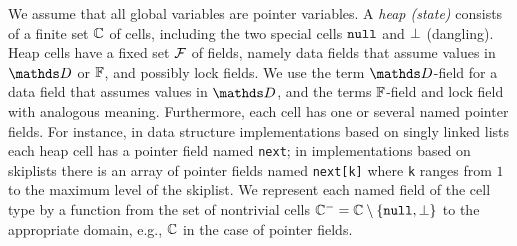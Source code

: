 We assume that all global variables are pointer variables.
A {\it heap (state)} consists of a finite set
${\mathbb C}$ of cells, including the two special cells
${\tt null}$ and $\bot$ (dangling).
Heap cells have a fixed set $\mathcal{F}$ of fields, namely
data fields that assume values in
$\ddomain$ or $\mathbb{F}$, and possibly lock fields.
We use the term $\ddomain$-field for a data field that
assumes values in $\ddomain$, and the terms $\mathbb{F}$-field and lock field
with analogous meaning.
Furthermore, each cell has one or several named pointer fields.
For instance, in data structure implementations based on singly linked lists
each heap cell has a pointer field named {\tt next}; in implementations
based on skiplists there is an array of pointer fields named
{\tt next[k]} where {\tt k} ranges from $1$ to the maximum level of the
skiplist.
We represent each named field of the cell type by a function from the set of
nontrivial cells ${\mathbb C}^{-} = {\mathbb C}\setminus\left\{{\tt null},\bot\right\}$ to
the appropriate domain, e.g., ${\mathbb C}$ in the case of pointer fields.

